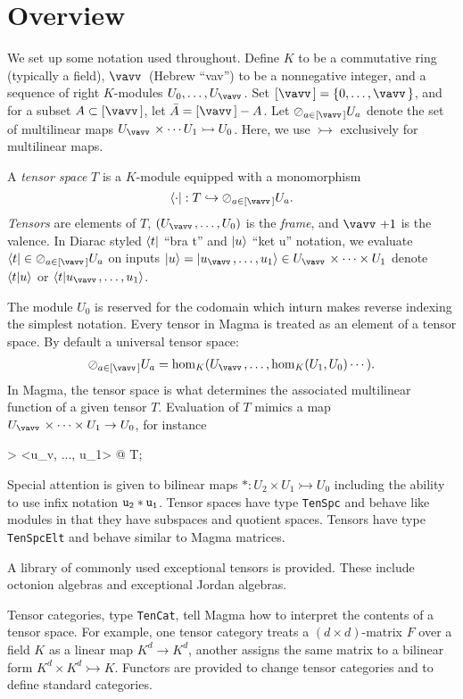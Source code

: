 \documentclass{documentation}
\begin{document}
\section{Overview}
We set up some notation used throughout.
Define $K$ to be a commutative ring (typically a field), $\vav$ (Hebrew ``vav'') to be a nonnegative integer, and a sequence of right $K$-modules $U_0,\dots,U_{\vav}$.
Set $[\vav]=\{0,\dots,\vav\}$, and for a subset $A\subset[\vav]$, let $\comp{A}=[\vav]-A$. 
Let $\rversor_{a\in[\vav]} U_a$ denote the set of multilinear maps $U_{\vav}\times\cdots U_1\rightarrowtail U_0$. 
Here, we use $\rightarrowtail$ exclusively for multilinear maps. 

A \emph{tensor space} $T$ is a $K$-module equipped with a monomorphism 
\[ \bra{\cdot} : T \hookrightarrow \rversor_{a\in[\vav]}U_a.\]
\emph{Tensors} are elements of $T$, $(U_{\vav},\dots,U_0)$ is the \emph{frame}, and $\vav+1$ is the valence. 
In Diarac styled $\langle t|$ ``bra t'' and $| u\rangle$ ``ket u'' notation, we evaluate $\bra{t}\in\rversor_{a\in[\vav]}U_a$ on inputs $\ket{u}=\ket{u_{\vav},\dots, u_1}\in U_{\vav}\times\cdots\times U_1$ denote $\langle t|u\rangle$ or $\bra{t} u_{\vav},\dots,u_1\rangle$. 

The module $U_0$ is reserved for the codomain which inturn makes
reverse indexing the simplest notation.
Every tensor in Magma is treated as an element of a tensor space.
By default a universal tensor space:
\begin{align*}
	\rversor_{a\in[\vav]} U_a = \hom_K(U_{\vav},\dots,\hom_K(U_1,U_0)\cdots).
\end{align*} 
In Magma, the tensor space is what determines the associated
multilinear function of a given tensor $T$.  
Evaluation of $T$ mimics a map
$U_{\vav}\times \cdots \times U_1\to U_0$, for instance
\begin{code}
> <u_v, ..., u_1> @ T;
\end{code}
Special attention is given to bilinear maps 
$*:U_2\times U_1\rightarrowtail U_0$
including the ability to use infix notation ${\tt u_2*u_1}$.
Tensor spaces have type {\tt TenSpc} and behave like modules 
in that they have subspaces and quotient spaces.  Tensors have type 
{\tt TenSpcElt} and behave similar to Magma matrices.


A library of commonly used exceptional tensors is provided.
These include octonion algebras and exceptional Jordan algebras.
 
Tensor categories, type {\tt TenCat}, tell Magma how to interpret the
contents of a tensor space.  For example, one tensor category treats a 
$(d\times d)$-matrix $F$ over a field $K$ as a linear map $K^d\to K^d$,
another assigns the same matrix to a bilinear form 
$K^d\times K^d\rightarrowtail K$.  Functors are provided to change
tensor categories and to define standard categories.  
\end{document}
